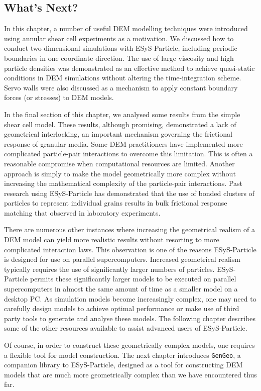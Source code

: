 \subsection*{What's Next?}

In this chapter, a number of useful DEM modelling techniques were introduced using annular shear cell experiments as a motivation. We discussed how to conduct two-dimensional simulations with ESyS-Particle, including periodic boundaries in one coordinate direction. The use of large viscosity and high particle densities was demonstrated as an effective method to achieve quasi-static conditions in DEM simulations without altering the time-integration scheme. Servo walls were also discussed as a mechanism to apply constant boundary forces (or stresses) to DEM models. 

In the final section of this chapter, we analysed some results from the simple shear cell model. These results, although promising, demonstrated a lack of geometrical interlocking, an important mechanism governing the frictional response of granular media. Some DEM practitioners have implemented more complicated particle-pair interactions to overcome this limitation. This is often a reasonable compromise when computational resources are limited. Another approach is simply to make the model geometrically more complex without increasing the mathematical complexity of the particle-pair interactions. Past research using ESyS-Particle has demonstrated that the use of bonded clusters of particles to represent individual grains results in bulk frictional response matching that observed in laboratory experiments. 

There are numerous other instances where increasing the geometrical realism of a DEM model can yield more realistic results without resorting to more complicated interaction laws. This observation is one of the reasons ESyS-Particle is designed for use on parallel supercomputers. Increased geometrical realism typically requires the use of significantly larger numbers of particles. ESyS-Particle permits these significantly larger models to be executed on parallel supercomputers in almost the same amount of time as a smaller model on a desktop PC. 
As simulation models become increasingly complex, one may need to carefully design models to achieve optimal performance or make use of third party tools to generate and analyse these models. The following chapter describes some of the other resources available to assist advanced users of ESyS-Particle.

Of course, in order to construct these geometrically complex models, one requires a flexible tool for model construction. The next chapter introduces \texttt{GenGeo}, a companion library to ESyS-Particle, designed as a tool for constructing DEM models that are much more geometrically complex than we have encountered thus far.

